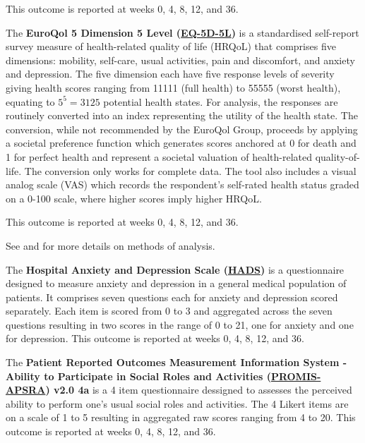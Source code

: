 \documentclass[11pt,parskip=half-]{scrartcl}
\begin{document}
This outcome is reported at weeks 0, 4, 8, 12, and 36.

\label{outcome:eq5d5l}
The \textbf{EuroQol 5 Dimension 5 Level (\hyperref[analysis:eq5d5l]{EQ-5D-5L})} is a standardised self-report survey measure of health-related quality of life (HRQoL) that comprises five dimensions: mobility, self-care, usual activities, pain and discomfort, and anxiety and depression. The five dimension each have five response levels of severity giving health scores ranging from 11111 (full health) to 55555 (worst health), equating to $5^5 = 3125$ potential health states. For analysis, the responses are routinely converted into an index representing the utility of the health state. The conversion, while not recommended by the EuroQol Group, proceeds by applying a societal preference function which generates scores anchored at 0 for death and 1 for perfect health and represent a societal valuation of health-related quality-of-life. The conversion only works for complete data. The tool also includes a visual analog scale (VAS) which records the respondent's self-rated health status graded on a 0-100 scale, where higher scores imply higher HRQoL.

This outcome is reported at weeks 0, 4, 8, 12, and 36.

See \cite{Req5d} and \cite{devlin2020methods} for more details on methods of analysis.

\label{outcome:hads}
The \textbf{Hospital Anxiety and Depression Scale (\hyperref[analysis:hads]{HADS})} \cite{zigmond1983hospital} is a questionnaire designed to measure anxiety and depression in a general medical population of patients. It comprises seven questions each for anxiety and depression scored separately. Each item is scored from 0 to 3 and aggregated across the seven questions resulting in two scores in the range of 0 to 21, one for anxiety and one for depression. This outcome is reported at weeks 0, 4, 8, 12, and 36.

\label{outcome:promis-apsra}
The \textbf{Patient Reported Outcomes Measurement Information System - Ability to Participate in Social Roles and Activities (\hyperref[analysis:promis-aspra]{PROMIS-APSRA}) v2.0 4a} \cite{cella2019promis} is a 4 item questionnaire dessigned to assesses the perceived ability to perform one’s usual social roles and activities. The 4 Likert items are on a scale of 1 to 5 resulting in aggregated raw scores ranging from 4 to 20. This outcome is reported at weeks 0, 4, 8, 12, and 36.
\end{document}
